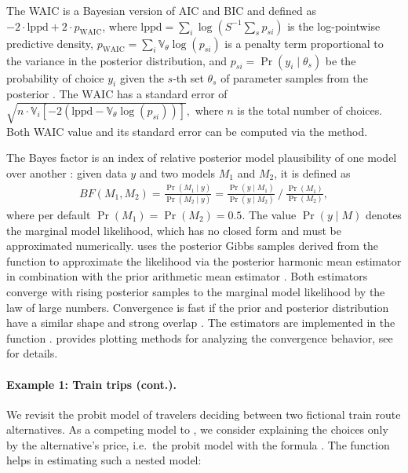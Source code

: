 \documentclass[article,shortnames]{jss}
\newcommand{\fct}[1]{\code{#1()}}
\begin{document}
The WAIC is a Bayesian version of AIC and BIC and defined as $-2 \cdot \text{lppd} + 2\cdot p_\text{WAIC}$, where $\text{lppd} = \sum_i \log \left( S^{-1} \sum_s p_{si} \right)$ is the log-pointwise predictive density, $p_\text{WAIC} = \sum_i \mathbb{V}_{\theta} \log (p_{si})$ is a penalty term proportional to the variance in the posterior distribution, and $p_{si} = \Pr(y_i\mid \theta_s)$ be the probability of choice $y_i$ given the $s$-th set $\theta_s$ of parameter samples from the posterior \citep[p.\ 220]{McElreath:2016}. The $\text{WAIC}$ has a standard error of $\sqrt{n \cdot \mathbb{V}_i \left[-2 \left(\text{lppd} - \mathbb{V}_{\theta} \log (p_{si}) \right)\right]},$ where $n$ is the total number of choices. Both WAIC value and its standard error can be computed via the \fct{WAIC} method.

The Bayes factor is an index of relative posterior model plausibility of one model over another \citep{Marin:2014}: given data $y$ and two models $M_1$ and $M_2$, it is defined as
\begin{align*}
BF(M_1,M_2) = \frac{\Pr(M_1 \mid y)}{\Pr(M_2 \mid y)} = \frac{\Pr(y \mid M_1 )}{\Pr(y \mid M_2)}~/~\frac{\Pr(M_1)}{\Pr(M_2)},
\end{align*}
where per default $\Pr(M_1) = \Pr(M_2) = 0.5$. The value $\Pr(y \mid M)$ denotes the marginal model likelihood, which has no closed form and must be approximated numerically.  uses the posterior Gibbs samples derived from the \fct{fit\_model} function to approximate the likelihood via the posterior harmonic mean estimator \citep{Newton:1994} in combination with the prior arithmetic mean estimator \citep{Hammersley:1964}. Both estimators converge with rising posterior samples to the marginal model likelihood by the law of large numbers. Convergence is fast if the prior and posterior distribution have a similar shape and strong overlap \citep{Gronau:2017}. The estimators are implemented in the function .  provides plotting methods for analyzing the convergence behavior, see  for details.

\paragraph{Example 1: Train trips (cont.).}

We revisit the probit model of travelers deciding between two fictional train route alternatives. As a competing model to , we consider explaining the choices only by the alternative's price, i.e.\ the probit model with the formula . The \fct{nested\_model} function helps in estimating such a nested model:
\end{document}
